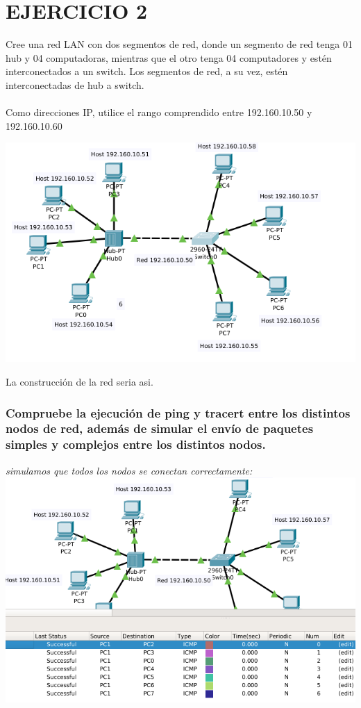 \section{EJERCICIO 2}
\begin{definicion}[]
{
Cree una red LAN con dos segmentos de red, donde un segmento
de red tenga 01 hub y 04 computadoras, mientras que el otro
tenga 04 computadores y est\'en interconectados a un switch. Los
segmentos de red, a su vez, est\'en interconectadas de hub a
switch.\\\\
Como direcciones IP, utilice el rango comprendido entre
192.160.10.50 y 192.160.10.60
}
\end{definicion} 
\includegraphics[scale=0.5]{img/dosswitchs.png}
\\\begin{center}
La construcci\'on de la red seria asi.
\end{center}
\subsubsection{Compruebe la ejecuci\'on de ping y tracert entre los distintos nodos de red, adem\'as de simular el env\'io de paquetes simples y complejos entre los distintos nodos.}
\textit{simulamos que todos los nodos se conectan correctamente:}\\

\includegraphics[scale=0.5]{img/prueba1.png} \\
